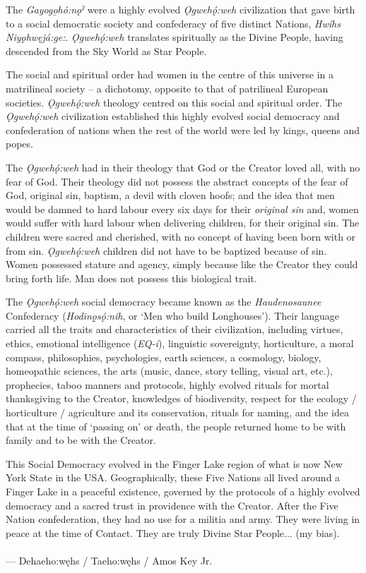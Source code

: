 
The \textit{Gayogo̱hó:nǫˀ} were a highly evolved \textit{Ǫgwehǫ́:weh} civilization that gave birth to a social democratic society and confederacy of five distinct Nations, \textit{Hwíhs Niyǫhwęjá:ge:}. \textit{Ǫgwehǫ́:weh} translates spiritually as the Divine People, having descended from the Sky World as Star People.

The social and spiritual order had women in the centre of this universe in a matrilineal society – a dichotomy, opposite to that of patrilineal European societies. \textit{Ǫgwehǫ́:weh} theology centred on this social and spiritual order. The \textit{Ǫgwehǫ́:weh} civilization established this highly evolved social democracy and confederation of nations when the rest of the world were led by kings, queens and popes.

The \textit{Ǫgwehǫ́:weh} had in their theology that God or the Creator loved all, with no fear of God. Their theology did not possess the abstract concepts of the fear of God, original sin, baptism, a devil with cloven hoofs; and the idea that men would be damned to hard labour every six days for their \emph{original sin} and, women would suffer with hard labour when delivering children, for their original sin. The children were sacred and cherished, with no concept of having been born with or from sin. \textit{Ǫgwehǫ́:weh} children did not have to be baptized because of sin. Women possessed stature and agency, simply because like the Creator they could bring forth life. Man does not possess this biological trait.

The \textit{Ǫgwehǫ́:weh} social democracy became known as the \emph{Haudenosaunee} Confederacy (\textit{Hodinǫ̱sǫ́:nih}, or ‘Men who build Longhouses’). Their language carried all the traits and characteristics of their civilization, including virtues, ethics, emotional intelligence (\emph{EQ-i}), linguistic sovereignty, horticulture, a moral compass, philosophies, psychologies, earth sciences, a cosmology, biology, homeopathic sciences, the arts (music, dance, story telling, visual art, etc.), prophecies, taboo manners and protocols, highly evolved rituals for mortal thanksgiving to the Creator, knowledges of biodiversity, respect for the ecology / horticulture / agriculture and its conservation, rituals for naming, and the idea that at the time of ‘passing on’ or death, the people returned home to be with family and to be with the Creator.

This Social Democracy evolved in the Finger Lake region of what is now New York State in the USA. Geographically, these Five Nations all lived around a Finger Lake in a peaceful existence, governed by the protocols of a highly evolved democracy and a sacred trust in providence with the Creator. After the Five Nation confederation, they had no use for a militia and army. They were living in peace at the time of Contact. They are truly Divine Star People... (my bias).\\\\
\noindent --- Dehaeho:węhs / Taeho:węhs / Amos Key Jr.



